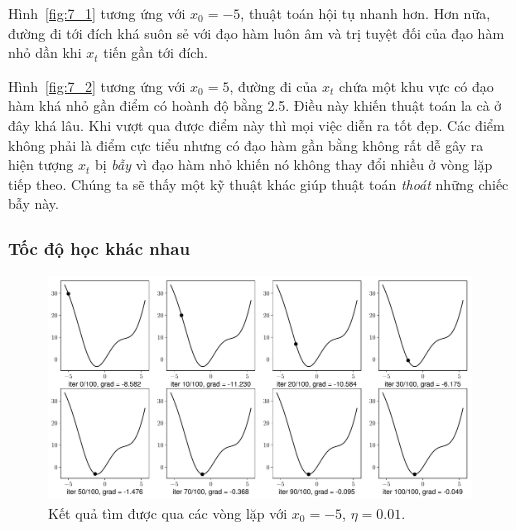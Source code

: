 
 
 
Hình~\ref{fig:7_1} tương ứng với $x_{0} = -5$, thuật toán hội tụ nhanh hơn. Hơn
nữa, {đường đi} tới đích khá suôn sẻ với đạo hàm luôn âm và trị tuyệt đối của
đạo hàm nhỏ dần khi $x_t$ tiến gần tới đích.

Hình~\ref{fig:7_2} tương ứng với $x_{0} = 5 $, {đường đi} của $x_t$ chứa một
khu vực có đạo hàm khá nhỏ gần điểm có hoành độ bằng 2.5. Điều này khiến thuật
toán {la cà} ở đây khá lâu. Khi vượt qua được điểm này thì mọi việc diễn ra tốt
đẹp. Các điểm không phải là điểm cực tiểu nhưng có đạo hàm gần bằng không rất dễ
gây ra hiện tượng $x_t$ bị \textit{bẫy} vì đạo hàm nhỏ khiến nó không thay đổi
nhiều ở vòng lặp tiếp theo. Chúng ta sẽ thấy một kỹ thuật khác giúp thuật toán
\textit{thoát} những chiếc bẫy này.
 
\subsubsection{Tốc độ học khác nhau}


\begin{figure}[t]
\centering
    \includegraphics[width =
    .975\textwidth]{ebookML_src/src/grad_descent/gd1d_1.pdf}
    \caption[]{Kết quả tìm được qua các vòng lặp với $x_0 = -5$, $\eta = 0.01$.}
    \label{fig:7_3}
\end{figure}

